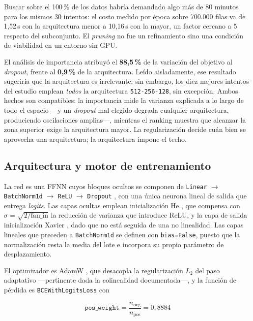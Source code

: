\documentclass[12pt,a4paper]{article}
\begin{document}
Buscar sobre el 100\,\% de los datos habría demandado algo más de 80 minutos para los mismos 30
intentos: el costo medido por época sobre 700.000 filas va de 1,52\,s con la arquitectura menor a
10,16\,s con la mayor, un factor cercano a 5 respecto del subconjunto. El \emph{pruning} no fue un
refinamiento sino una condición de viabilidad en un entorno sin GPU.

El análisis de importancia atribuyó el \textbf{88,5\,\%} de la variación del objetivo al
\emph{dropout}, frente al \textbf{0,9\,\%} de la arquitectura. Leído aisladamente, ese resultado
sugeriría que la arquitectura es irrelevante; sin embargo, los diez mejores intentos del estudio
emplean \emph{todos} la arquitectura \texttt{512-256-128}, sin excepción. Ambos hechos son
compatibles: la importancia mide la varianza explicada a lo largo de todo el espacio ---y un
\emph{dropout} mal elegido degrada cualquier arquitectura, produciendo oscilaciones amplias---,
mientras el ranking muestra que alcanzar la zona superior exige la arquitectura mayor. La
regularización decide cuán bien se aprovecha una arquitectura; la arquitectura impone el techo.

\subsection{Arquitectura y motor de entrenamiento}

La red es una FFNN cuyos bloques ocultos se componen de \texttt{Linear} $\rightarrow$
\texttt{BatchNorm1d} \citep{batchnorm} $\rightarrow$ \texttt{ReLU} $\rightarrow$ \texttt{Dropout}
\citep{dropout}, con una única neurona lineal de salida que entrega \emph{logits}. Las capas
ocultas emplean inicialización He \citep{he2015}, que compensa con $\sigma = \sqrt{2/\text{fan\_in}}$
la reducción de varianza que introduce ReLU, y la capa de salida inicialización Xavier
\citep{glorot}, dado que no está seguida de una no linealidad. Las capas lineales que preceden a
\texttt{BatchNorm1d} se definen con \texttt{bias=False}, puesto que la normalización resta la
media del lote e incorpora su propio parámetro de desplazamiento.

El optimizador es AdamW \citep{adamw}, que desacopla la regularización $L_2$ del paso adaptativo
---pertinente dada la colinealidad documentada---, y la función de pérdida es
\texttt{BCEWithLogitsLoss} con

\begin{equation}
\texttt{pos\_weight} = \frac{n_{\text{neg}}}{n_{\text{pos}}} = 0{,}8884
\label{eq:posweight}
\end{equation}
\end{document}
